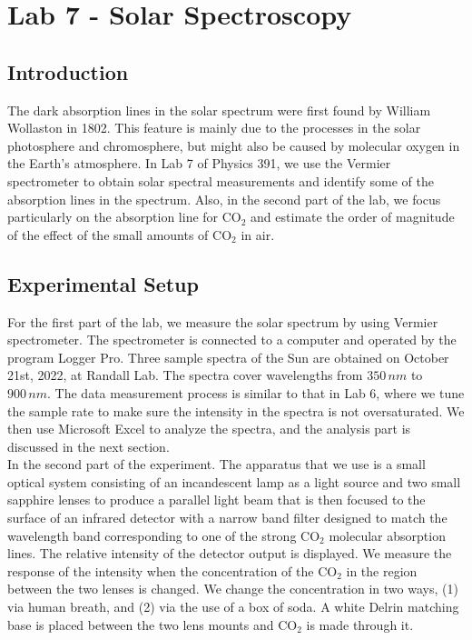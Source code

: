 \documentclass[11pt]{book}
\theoremstyle{break}
\theoremstyle{break}
\begin{document}
\newpage
\tableofcontents
{}


\setcounter{chapter}{6}
\chapter*{Lab 7 - Solar Spectroscopy}
\section{Introduction}
The dark absorption lines in the solar spectrum were first found by William Wollaston in 1802. This feature is mainly due to the processes in the solar photosphere and chromosphere, but might also be caused by molecular oxygen in the Earth's atmosphere. In Lab 7 of Physics 391, we use the Vermier spectrometer to obtain solar spectral measurements and identify some of the absorption lines in the spectrum. Also, in the second part of the lab, we focus particularly on the absorption line for $\text{CO}_2$ and estimate the order of magnitude of the effect of the small amounts of $\text{CO}_2$ in air. \\

\section{Experimental Setup}
For the first part of the lab, we measure the solar spectrum by using Vermier spectrometer. The spectrometer is connected to a computer and operated by the program Logger Pro. Three sample spectra of the Sun are obtained on October 21st, 2022, at Randall Lab. The spectra cover wavelengths from $350\, nm$ to $900\, nm$. The data measurement process is similar to that in Lab 6, where we tune the sample rate to make sure the intensity in the spectra is not oversaturated. We then use Microsoft Excel to analyze the spectra, and the analysis part is discussed in the next section.\\

In the second part of the experiment. The apparatus that we use is a small optical system consisting of an incandescent lamp as a light source and two small sapphire lenses to produce a parallel light beam that is then focused to the surface of an infrared detector with a narrow band filter designed to match the wavelength band corresponding to one of the strong $\text{CO}_2$ molecular absorption lines. The relative intensity of the detector output is displayed. We measure the response of the intensity when the concentration of the $\text{CO}_2$ in the region between the two lenses is changed. We change the concentration in two ways, (1) via human breath, and (2) via the use of a box of soda. A white Delrin matching base is placed between the two lens mounts and $\text{CO}_2$ is made through it. \\
\newpage
\end{document}

